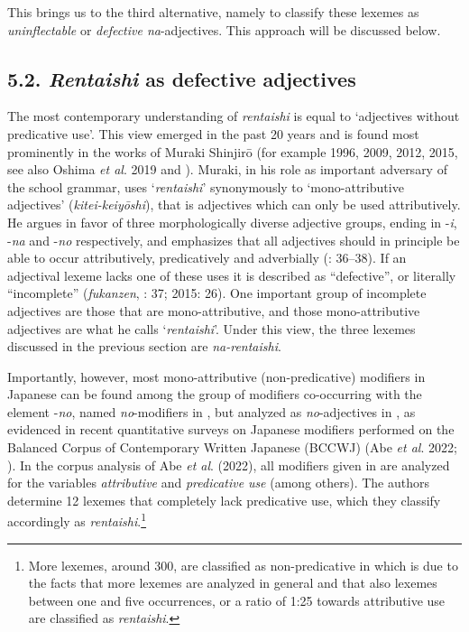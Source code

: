 \documentclass[output=paper]{langscibook}
\begin{document}
This brings us to the third alternative, namely to classify these lexemes as \textit{uninflectable} or \textit{defective na}{}-adjectives. This approach will be discussed below.

\subsection{5.2. \textit{Rentaishi} as defective adjectives}

The most contemporary understanding of \textit{rentaishi} is equal to ‘adjectives without predicative use’. This view emerged in the past 20 years and is found most prominently in the works of Muraki Shinjirō (for example 1996, 2009, 2012, 2015, see also Oshima \textit{et al}. 2019 and \citealt{OshimaHayashi2021a,OshimaHayashi2021b}). Muraki, in his role as important adversary of the school grammar, uses ‘\textit{rentaishi}’ synonymously to ‘mono-attributive adjectives’ (\textit{kitei-keiyōshi}), that is adjectives which can only be used attributively. He argues in favor of three morphologically diverse adjective groups, ending in -\textit{i}, -\textit{na} and -\textit{no} respectively, and emphasizes that all adjectives should in principle be able to occur attributively, predicatively and adverbially (\citealt{Muraki2012}: 36–38). If an adjectival lexeme lacks one of these uses it is described as “defective”, or literally “incomplete” (\textit{fukanzen}, \citealt{Muraki2012}: 37; 2015: 26). One important group of incomplete adjectives are those that are mono-attributive, and those mono-attributive adjectives are what he calls ‘\textit{rentaishi}’. Under this view, the three lexemes discussed in the previous section are \textit{na-rentaishi}. 

Importantly, however, most mono-attributive (non-predicative) modifiers in Japanese can be found among the group of modifiers co-occurring with the element -\textit{no}, named \textit{no}{}-modifiers in \citet{Köhlich2023}, but analyzed as \textit{no}{}-adjectives in \citet{Muraki2012}, as evidenced in recent quantitative surveys on Japanese modifiers performed on the Balanced Corpus of Contemporary Written Japanese (BCCWJ) (Abe \textit{et al}. 2022; \citealt{Köhlich2023}). In the corpus analysis of Abe \textit{et al}. (2022), all modifiers given in \citet{Muraki2012} are analyzed for the variables \textit{attributive} and \textit{predicative} \textit{use} (among others). The authors determine 12 lexemes that completely lack predicative use, which they classify accordingly as \textit{rentaishi}.\footnote{More lexemes, around 300, are classified as non-predicative in \citet{Köhlich2023} which is due to the facts that more lexemes are analyzed in general and that also lexemes between one and five occurrences, or a ratio of 1:25 towards attributive use are classified as \textit{rentaishi}.}
\end{document}
